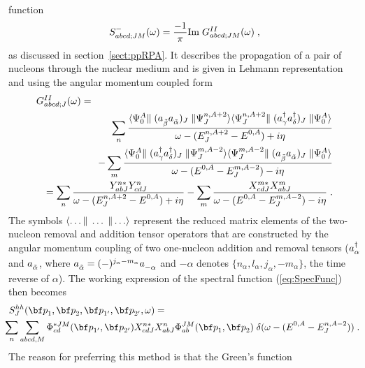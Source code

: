 function
%
	\begin{equation}
		S^-_{abcd;JM}(\omega)
	=
		\frac{-1}{\pi} {\rm Im} \; G^{II}_{abcd;JM}(\omega)
	\;,
	\end{equation}
%
as discussed in section~\ref{sect:ppRPA}.
It describes the propagation of a pair of nucleons through the nuclear medium 
and is given in Lehmann representation and using the angular momentum coupled 
form 
%
	\begin{eqnarray}
	\lefteqn{%
		G^{II}_{abcd;J}(\omega)
	=} 
	\label{eq:g2} 
	\\
	&&
		\sum_{n}
		\frac{
		\RME<\Psi^A_0| (\Oa{\tilde{\beta}} \Oa{\tilde{\alpha}})_J|%
		\Psi^{n,A+2}_J >
		\RME<\Psi^{n,A+2}_{J}| (\Oc{\gamma} \Oc{\delta})_J|%
		\Psi^A_0 >
		}{ \omega - (E^{n,A+2}_{J} - \EnulA) + i \eta }
	\nonumber \\
	&&
	-
		\sum_{m}
		\frac{
		\RME<\Psi^A_0| (\Oc{\gamma} \Oc{\delta})_J|%
		\Psi^{m,A-2}_J >
		\RME<\Psi^{m,A-2}_{J}| 
			(\Oa{\tilde{\beta}} \Oa{\tilde{\alpha}})_J|%
		\Psi^A_0 >
		}{ \omega - (\EnulA - E^{m,A-2}_{J}) - i \eta }
	\nonumber \\
	&&
	=
		\sum_{n}
		\frac{
		Y^{n\ast}_{ab J} Y^{n}_{cd J}
		}{ \omega - (E^{n,A+2}_{J} - \EnulA) + i \eta }
	-
		\sum_{m}
		\frac{
		X^{m\ast}_{cd J} X^{m}_{ab J}
		}{ \omega - (\EnulA - E^{m,A-2}_{J} ) - i \eta }
	\nonumber
	\;.
	\end{eqnarray}
%
The symbols $\RME<\ldots|\ldots|\ldots>$ represent the reduced matrix elements%
\cite{Ed57,BG77,FW71}
of the two-nucleon removal and addition tensor operators that
are constructed by the angular momentum coupling of two one-nucleon addition
and removal tensors ($\Oc{\alpha}$ and $\Oa{\tilde{\alpha}}$, where
$\Oa{\tilde{\alpha}}=(-)^{j_\alpha-m_\alpha}\Oa{-\alpha}$ and
 $-\alpha$ denotes $\{n_\alpha, l_\alpha, j_\alpha, -m_\alpha\}$, the 
time reverse of $\alpha$).
The working expression of the spectral function (\ref{eq:SpecFunc}) 
then becomes 
%
	\begin{eqnarray}
	\lefteqn{%
		S^{hh}_J( \rvec{p}_1, \rvec{p}_2, 
		          \rvec{p}_{1'}, \rvec{p}_{2'}, \omega )
	=
	} && 
	\label{eq:SpecFuncW}
	\\
	&&
	\hspace{-0.5cm}
		\sum_{n}
		\sum_{abcd,M}
		\Phi^{\ast JM}_{cd}( \rvec{p}_{1'}, \rvec{p}_{2'} )
		X^{n\ast}_{cd J} X^{n}_{ab J} 
		\Phi^{JM}_{ab}( \rvec{p}_1, \rvec{p}_2 )
		\;
		\delta(\omega - (\EnulA -E^{n,A-2}_{J}) )
	\nonumber
	\;.
	\end{eqnarray}
%
The reason for preferring this method is that the Green's function 
